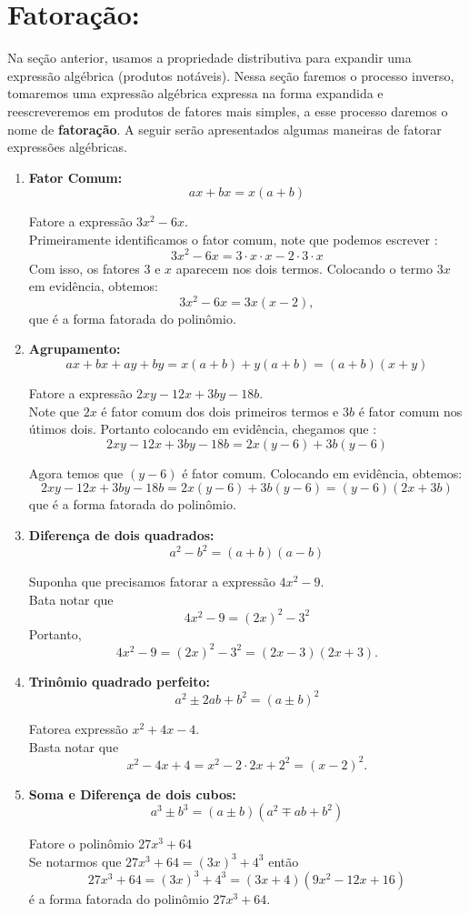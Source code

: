 \section{Fatoração:}
Na seção anterior, usamos a propriedade distributiva para expandir uma expressão algébrica (produtos notáveis). Nessa seção faremos o processo inverso, tomaremos uma expressão algébrica expressa na forma expandida e reescreveremos em produtos de fatores mais simples, a esse processo daremos o nome de \textbf{fatoração}. A seguir serão apresentados algumas maneiras de fatorar expressões algébricas. \\
\begin{enumerate}
 \item \textbf{Fator Comum:}
$$ax+bx=x(a+b)$$
\begin{exe} Fatore a expressão $3x^2-6x$. \\
\color{red}
Primeiramente identificamos o fator comum, note que podemos escrever :
$$3x^2-6x=3\cdot x\cdot x-2\cdot3\cdot x$$
Com isso, os fatores $3$ e $x$ aparecem nos dois termos. Colocando o termo $3x$ em evidência, obtemos:
$$3x^2-6x=3x(x-2),$$
que é a forma fatorada do polinômio.
\color{black}
\end{exe}
\item \textbf{Agrupamento:}
$$ax+bx+ay+by=x(a+b)+y(a+b)=(a+b)(x+y)$$
\begin{exe} Fatore a expressão $2xy-12x+3by-18b$. \\
\color{red}
Note que $2x$ é fator comum dos dois primeiros termos e $3b$ é fator comum nos útimos dois. Portanto colocando em evidência, chegamos que :
$$ 2xy-12x+3by-18b= 2x(y-6)+3b(y-6)$$

Agora temos que $(y-6)$ é fator comum. Colocando em evidência, obtemos:
$$ 2xy-12x+3by-18b= 2x(y-6)+3b(y-6)=(y-6)(2x+3b)$$ que é a forma fatorada do polinômio.
\end{exe}
\color{black}

\item \textbf{Diferença de dois quadrados:}
$$a^2-b^2=(a+b)(a-b)$$
\begin{exe} Suponha que precisamos fatorar a expressão $4x^2-9$. \\
\color{red}
Bata notar que
$$4x^2-9=(2x)^2-3^2$$
Portanto,
$$4x^2-9=(2x)^2-3^2=(2x-3)(2x+3).$$
\end{exe}
\color{black}
\item \textbf{Trinômio quadrado perfeito:}
$$a^2\pm 2ab+ b^2=(a \pm b)^2$$
\begin{exe} Fatorea expressão $x^2+4x-4$. \\
\color{red}
Basta notar que
$$x^2-4x+4=x^2-2\cdot2x+2^2=(x-2)^2.$$
\end{exe}
\color{black}
\item \textbf{Soma e Diferença de dois cubos:}
$$a^3 \pm b^3=(a \pm b)(a^2 \mp ab+b^2)$$
\begin{exe} Fatore o polinômio $27x^3+64$ \\
\color{red}
Se notarmos que $27x^3+64= (3x)^3+4^3$ então
$$27x^3+64= (3x)^3+4^3=(3x+4)(9x^2-12x+16)$$
é a forma fatorada do polinômio $27x^3+64$.
\color{black}
\end{exe}


\end{enumerate}
